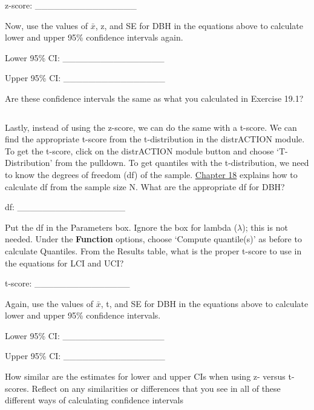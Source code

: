 \documentclass[
]{scrbook}
\begin{document}
z-score: \_\_\_\_\_\_\_\_\_\_\_\_\_\_\_\_

Now, use the values of \(\bar{x}\), z, and SE for DBH in the equations above to calculate lower and upper 95\% confidence intervals again.

Lower 95\% CI: \_\_\_\_\_\_\_\_\_\_\_\_\_\_\_\_

Upper 95\% CI: \_\_\_\_\_\_\_\_\_\_\_\_\_\_\_\_

Are these confidence intervals the same as what you calculated in Exercise 19.1?

\begin{verbatim}

\end{verbatim}

Lastly, instead of using the z-score, we can do the same with a t-score.
We can find the appropriate t-score from the t-distribution in the distrACTION module.
To get the t-score, click on the distrACTION module button and choose `T-Distribution' from the pulldown.
To get quantiles with the t-distribution, we need to know the degrees of freedom (df) of the sample.
\protect\hyperlink{Chapter_18}{Chapter 18} explains how to calculate df from the sample size N.
What are the appropriate df for DBH?

df: \_\_\_\_\_\_\_\_\_\_\_\_\_\_\_\_\_

Put the df in the Parameters box.
Ignore the box for lambda (\(\lambda\)); this is not needed.
Under the \textbf{Function} options, choose `Compute quantile(s)' as before to calculate Quantiles.
From the Results table, what is the proper t-score to use in the equations for LCI and UCI?

t-score: \_\_\_\_\_\_\_\_\_\_\_\_\_\_\_

Again, use the values of \(\bar{x}\), t, and SE for DBH in the equations above to calculate lower and upper 95\% confidence intervals.

Lower 95\% CI: \_\_\_\_\_\_\_\_\_\_\_\_\_\_\_\_

Upper 95\% CI: \_\_\_\_\_\_\_\_\_\_\_\_\_\_\_\_

How similar are the estimates for lower and upper CIs when using z- versus t-scores.
Reflect on any similarities or differences that you see in all of these different ways of calculating confidence intervals

\begin{verbatim}




\end{verbatim}
\end{document}
